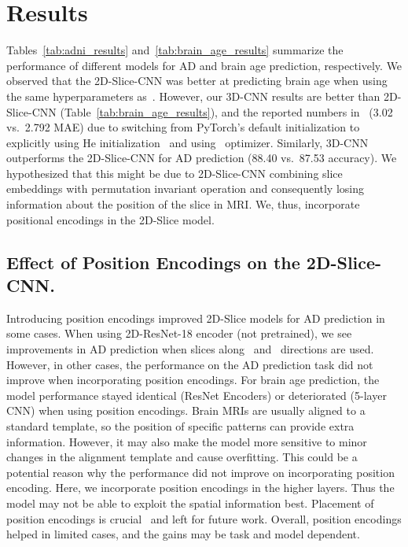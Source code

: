 \section{Results}
Tables~\ref{tab:adni_results} and~\ref{tab:brain_age_results}  summarize the performance of different models for  AD and brain age  prediction, respectively. We observed that the 2D-Slice-CNN was better at predicting brain age when using the same hyperparameters as~\cite{gupta2021improved}. However, our 3D-CNN results are better than 2D-Slice-CNN (Table~\ref{tab:brain_age_results}), and the reported numbers in~\cite{gupta2021improved} (3.02 vs.\ 2.792 MAE) due to switching from PyTorch's default initialization to explicitly using He initialization~\cite{he2015delving} and using \sgd\ optimizer. Similarly, 3D-CNN outperforms the 2D-Slice-CNN for AD prediction (88.40 vs.\ 87.53 accuracy). We hypothesized that this might be due to 2D-Slice-CNN combining slice embeddings with permutation invariant operation and consequently losing information about the position of the slice in MRI. We, thus, incorporate positional encodings in the 2D-Slice model.

\subsection{Effect of Position Encodings on the 2D-Slice-CNN.}
Introducing position encodings improved 2D-Slice models for AD prediction in some cases. When using 2D-ResNet-18 encoder (not pretrained), we see improvements in AD prediction when slices along \axisone\ and \axisthree\ directions are used. However, in other cases, the performance on the AD prediction task did not improve when incorporating position encodings.  For brain age prediction, the model performance stayed identical (ResNet Encoders) or deteriorated (5-layer CNN) when using position encodings.
Brain MRIs are usually aligned to a standard template, so the position of specific patterns can provide extra information. However, it may also make the model more sensitive to minor changes in the alignment template and cause overfitting. This could be a potential reason why the performance did not improve on incorporating position encoding.   Here,  we incorporate position encodings in the higher layers. Thus the model may not be able to exploit the spatial information best. Placement of position encodings is crucial~\cite{chen2021demystifying} and left for future work. Overall, position encodings helped in limited cases, and the gains may be task and model dependent.



